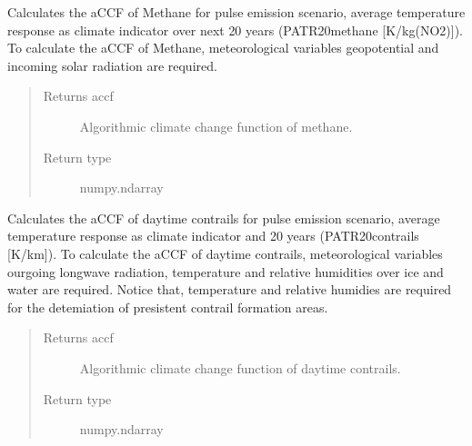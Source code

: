 \documentclass[a4paper,11pt,english]{sphinxmanual}
\begin{document}
\begin{fulllineitems}

\begin{fulllineitems}
\label{\detokenize{modules:envlib.accf.GeTaCCFs.accf_ch4}}
Calculates the aCCF of Methane for pulse emission scenario, average temperature response as climate
indicator over next 20 years (P\sphinxhyphen{}ATR20\sphinxhyphen{}methane {[}K/kg(NO2){]}). To calculate the aCCF of Methane, meteorological
variables geopotential and incoming solar radiation are required.
\begin{quote}\begin{description}
\item[{Returns accf}] \leavevmode
Algorithmic climate change function of methane.

\item[{Return type}] \leavevmode
numpy.ndarray

\end{description}\end{quote}

\end{fulllineitems}


\begin{fulllineitems}
\label{\detokenize{modules:envlib.accf.GeTaCCFs.accf_dcontrail}}
Calculates the aCCF of day\sphinxhyphen{}time contrails for pulse emission scenario, average temperature response as
climate indicator and 20 years (P\sphinxhyphen{}ATR20\sphinxhyphen{}contrails {[}K/km{]}). To calculate the aCCF of day\sphinxhyphen{}time contrails,
meteorological variables ourgoing longwave radiation, temperature and relative humidities over ice and water
are required. Notice that, temperature and relative humidies are required for the detemiation of presistent
contrail formation areas.
\begin{quote}\begin{description}
\item[{Returns accf}] \leavevmode
Algorithmic climate change function of day\sphinxhyphen{}time contrails.

\item[{Return type}] \leavevmode
numpy.ndarray


\end{description}
\end{quote}
\end{fulllineitems}
\end{fulllineitems}
\end{document}
